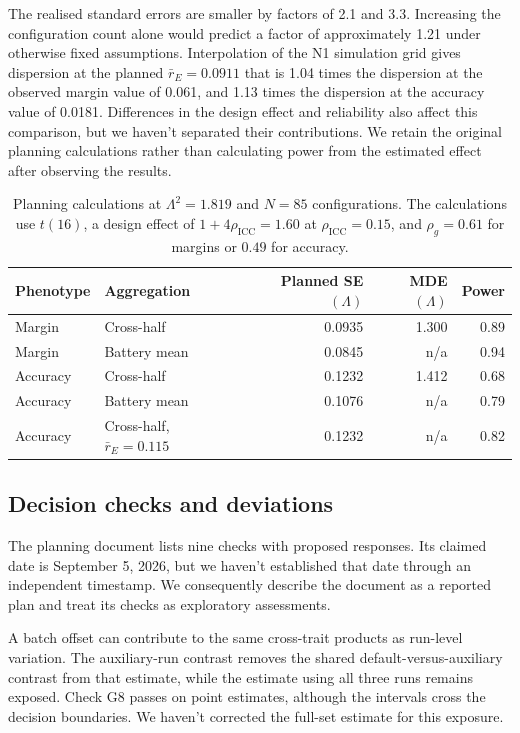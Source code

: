 The realised standard errors are smaller by factors of 2.1 and 3.3. Increasing the configuration count alone would predict a factor of approximately 1.21 under otherwise fixed assumptions. Interpolation of the N1 simulation grid gives dispersion at the planned $\bar r_E=0.0911$ that is 1.04 times the dispersion at the observed margin value of 0.061, and 1.13 times the dispersion at the accuracy value of 0.0181. Differences in the design effect and reliability also affect this comparison, but we haven't separated their contributions. We retain the original planning calculations rather than calculating power from the estimated effect after observing the results.

\begin{table}[htbp]
\centering\small
\caption{Planning calculations at $\Lambda^2=1.819$ and $N=85$ configurations. The calculations use $t(16)$, a design effect of $1+4\rho_{\mathrm{ICC}}=1.60$ at $\rho_{\mathrm{ICC}}=0.15$, and $\rho_g=0.61$ for margins or $0.49$ for accuracy.}
\label{tab:original4}
\begin{tabular}{llrrr}\hline
Phenotype & Aggregation & Planned SE$(\Lambda)$ & MDE$(\Lambda)$ & Power\\\hline
Margin & Cross-half & 0.0935 & 1.300 & 0.89\\
Margin & Battery mean & 0.0845 & n/a & 0.94\\
Accuracy & Cross-half & 0.1232 & 1.412 & 0.68\\
Accuracy & Battery mean & 0.1076 & n/a & 0.79\\
Accuracy & Cross-half, $\bar r_E=0.115$ & 0.1232 & n/a & 0.82\\\hline
\end{tabular}
\end{table}

\subsection{Decision checks and deviations}
The planning document lists nine checks with proposed responses. Its claimed date is September 5, 2026, but we haven't established that date through an independent timestamp. We consequently describe the document as a reported plan and treat its checks as exploratory assessments.

A batch offset can contribute to the same cross-trait products as run-level variation. The auxiliary-run contrast removes the shared default-versus-auxiliary contrast from that estimate, while the estimate using all three runs remains exposed. Check G8 passes on point estimates, although the intervals cross the decision boundaries. We haven't corrected the full-set estimate for this exposure.

